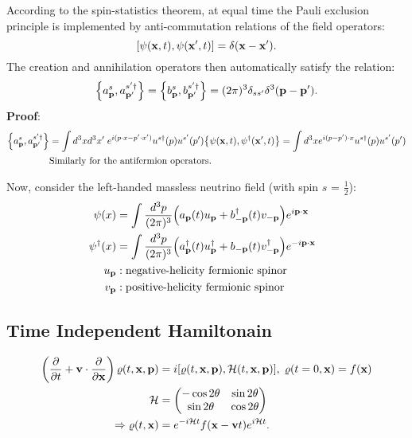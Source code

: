 \documentclass[11pt,a4paper]{article}
\begin{document}
    \noindent According to the spin-statistics theorem, at equal time the Pauli exclusion principle is implemented by anti-commutation relations of the field operators:
    \[
    \comm{\psi(\vb{x}, t)}{\psi(\vb{x}^{\prime}, t)} = \delta(\vb{x} - \vb{x}^{\prime}) .\] 
    \noindent The creation and annihilation operators then automatically satisfy the relation:
    \[
       \acomm{a_{\vb{p}}^{s}}{a_{\vb{p}^{\prime}}^{s^{\prime} \dagger}} = \acomm{b_{\vb{p}}^{s}}{b_{\vb{p}^{\prime}}^{s^{\prime}\dagger}} = (2\pi)^{3} \delta_{s s^{\prime}}\delta^{3}(\vb{p} - \vb{p}^{\prime}) 
 .\]
 \textbf{Proof}:
    \begin{align*}
       \acomm{a_{\vb{p}}^{s}}{a_{\vb{p}^{\prime}}^{s^{\prime} \dagger}} &= \int d^{3}x d^{3}x^{\prime} \hspace{0.1cm}e^{i(p \cdot x - p^{\prime}\cdot x^{\prime})} u^{s \dagger}(p) u^{s^{\prime}}(p^{\prime})\acomm{\psi (\vb{x}, t)}{\psi ^{\dagger}(\vb{x}^{\prime}, t)} = \int d^{3}x e^{i(p-p^{\prime}) \cdot x} u^{s \dagger}(p) u^{s^{\prime}}(p^{\prime}) \\
            &\text{Similarly for the antifermion operators.}
    \end{align*}

    \noindent Now, consider the left-handed massless neutrino field (with spin $s$ = $\frac{1}{2}$):
\begin{align*}
   \psi(x) &= \int \frac{d^{3}p}{(2\pi)^{3}}\Big(a_{\vb{p}}(t)u_{\vb{p}} + b^{\dagger}_{-\vb{p}}(t)v_{-\vb{p}}\Big)e^{i \vb{p} \cdot \vb{x}} \hspace{0.5cm}\\ 
   \psi ^{\dagger}(x) &= \int \frac{d^{3}p}{(2\pi)^{3}}\Big(a_{\vb{p}}^{\dagger}(t)u_{\vb{p}}^{\dagger} + b_{-\vb{p}}(t)v^{\dagger}_{-\vb{p}}\Big)e^{-i \vb{p} \cdot \vb{x}}\\
   u_{\vb{p}}&: \text{negative-helicity fermionic spinor}\\
   v_{\vb{p}}&: \text{positive-helicity fermionic spinor}
 \end{align*}


\subsection{Time Independent Hamiltonain}%
\label{sub:Time Independent Hamiltonain}
\begin{align*}
   \left(  \frac{\partial}{\partial t} + \vb{v}\cdot \frac{\partial}{\partial \vb{x}} \right) \varrho(t,\vb{x}, \vb{p}) &= i \comm{\varrho (t, \vb{x}, \vb{p})}{\mathcal{H}(t, \vb{x}, \vb{p})} , \hspace{0.1cm}\varrho(t=0,\vb{x}) = f(\vb{x})\\
   \mathcal{H} &= \begin{pmatrix}
 -\cos 2\theta & \sin 2\theta\\
\sin 2\theta & \cos 2\theta \\
\end{pmatrix}\\
      \Rightarrow \varrho(t,\vb{x}) &= e^{-i\mathcal{H}t}f(\vb{x} - \vb{v}t)e^{i\mathcal{H}t} 
.\end{align*}
\end{document}
